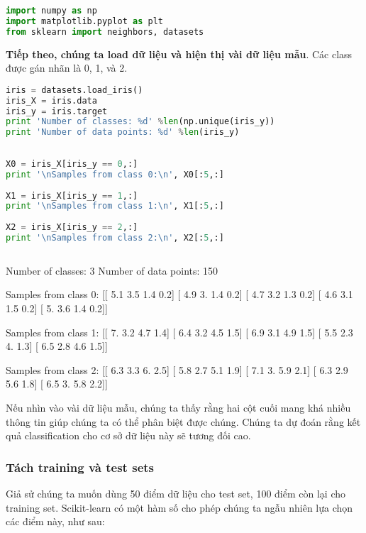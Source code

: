  
\begin{lstlisting}[language=Python]
import numpy as np 
import matplotlib.pyplot as plt 
from sklearn import neighbors, datasets 
\end{lstlisting}
 
\textbf{Tiếp theo, chúng ta load dữ liệu và hiện thị vài dữ liệu mẫu}. Các class được gán nhãn là 0, 1, và 2.  
 
 
\begin{lstlisting}[language=Python]
iris = datasets.load_iris() 
iris_X = iris.data 
iris_y = iris.target 
print 'Number of classes: %d' %len(np.unique(iris_y)) 
print 'Number of data points: %d' %len(iris_y) 
 
 
X0 = iris_X[iris_y == 0,:] 
print '\nSamples from class 0:\n', X0[:5,:] 
 
X1 = iris_X[iris_y == 1,:] 
print '\nSamples from class 1:\n', X1[:5,:] 
 
X2 = iris_X[iris_y == 2,:] 
print '\nSamples from class 2:\n', X2[:5,:] 
 
\end{lstlisting}
 
    Number of classes: 3 
    Number of data points: 150 
     
    Samples from class 0: 
    [[ 5.1  3.5  1.4  0.2] 
     [ 4.9  3.   1.4  0.2] 
     [ 4.7  3.2  1.3  0.2] 
     [ 4.6  3.1  1.5  0.2] 
     [ 5.   3.6  1.4  0.2]] 
     
    Samples from class 1: 
    [[ 7.   3.2  4.7  1.4] 
     [ 6.4  3.2  4.5  1.5] 
     [ 6.9  3.1  4.9  1.5] 
     [ 5.5  2.3  4.   1.3] 
     [ 6.5  2.8  4.6  1.5]] 
     
    Samples from class 2: 
    [[ 6.3  3.3  6.   2.5] 
     [ 5.8  2.7  5.1  1.9] 
     [ 7.1  3.   5.9  2.1] 
     [ 6.3  2.9  5.6  1.8] 
     [ 6.5  3.   5.8  2.2]] 
 
 
Nếu nhìn vào vài dữ liệu mẫu, chúng ta thấy rằng hai cột cuối mang khá nhiều thông tin giúp chúng ta có thể  phân biệt được chúng. Chúng ta dự đoán rằng kết quả classification cho cơ sở dữ liệu này sẽ tương đối cao. 
 
 
 
\subsubsection{Tách training và test sets}
Giả sử chúng ta muốn dùng 50 điểm dữ liệu cho test set, 100 điểm còn lại cho training set. Scikit-learn có một hàm số cho phép chúng ta ngẫu nhiên lựa chọn các điểm này, như sau: 
 
